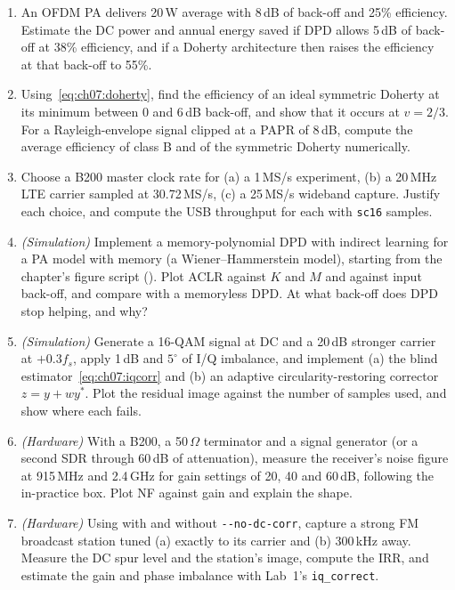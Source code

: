 \begin{enumerate}[label=\thechapter.\arabic*]
than 3\,dB of desensitisation. What LO phase noise at 3\,MHz offset is required? Repeat for a $-43$\,dBm
blocker at 600\,kHz.
\item An OFDM PA delivers 20\,W average with 8\,dB of back-off and 25\% efficiency. Estimate the DC
power and annual energy saved if DPD allows 5\,dB of back-off at 38\% efficiency, and if a Doherty
architecture then raises the efficiency at that back-off to 55\%.
\item Using~\eqref{eq:ch07:doherty}, find the efficiency of an ideal symmetric Doherty at its minimum
between 0 and 6\,dB back-off, and show that it occurs at $v=2/3$. For a Rayleigh-envelope signal clipped
at a PAPR of 8\,dB, compute the average efficiency of class B and of the symmetric Doherty numerically.
\item Choose a B200 master clock rate for (a) a 1\,MS/s experiment, (b) a 20\,MHz LTE carrier sampled at
30.72\,MS/s, (c) a 25\,MS/s wideband capture. Justify each choice, and compute the USB throughput for
each with \texttt{sc16} samples.
\item \emph{(Simulation)} Implement a memory-polynomial DPD with indirect learning for a PA model with
memory (a Wiener--Hammerstein model), starting from the chapter's figure script (). Plot ACLR
against $K$ and $M$ and against input back-off, and compare with a memoryless DPD. At what back-off does
DPD stop helping, and why?
\item \emph{(Simulation)} Generate a 16-QAM signal at DC and a 20\,dB stronger carrier at $+0.3f_s$,
apply 1\,dB and $5^\circ$ of I/Q imbalance, and implement (a) the blind estimator~\eqref{eq:ch07:iqcorr}
and (b) an adaptive circularity-restoring corrector $z=y+wy^*$. Plot the residual image against the
number of samples used, and show where each fails.
\item \emph{(Hardware)} With a B200, a 50\,$\Omega$ terminator and a signal generator (or a second
SDR through 60\,dB of attenuation), measure the receiver's noise figure at 915\,MHz and 2.4\,GHz for gain
settings of 20, 40 and 60\,dB, following the in-practice box. Plot NF against gain and explain the shape.
\item \emph{(Hardware)} Using  with and without
\texttt{-{}-no-dc-corr}, capture a strong FM broadcast station tuned (a) exactly to its carrier and (b)
300\,kHz away. Measure the DC spur level and the station's image, compute the IRR, and estimate the gain
and phase imbalance with Lab~1's \texttt{iq\_correct}.
\end{enumerate}

